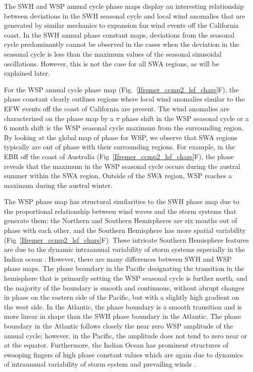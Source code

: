 \documentclass[draft,linenumbers]{agujournal2018}
\begin{document}
The SWH and WSP annual cycle phase maps display an interesting relationship between deviations in the SWH seasonal cycle and local wind anomalies that are generated by similar mechanics to expansion fan wind events off the California coast. In the SWH annual phase constant maps, deviations from the seasonal cycle predominantly cannot be observed in the cases when the deviation in the seasonal cycle is less than the maximum values of the seasonal sinusoidal oscillations. However, this is not the case for all SWA regions, as will be explained later.  

For the WSP annual cycle phase map (Fig.~\ref{Ifremer_ccmp2_lsf_chars}F), the phase constant clearly outlines regions where local wind anomalies similar to the EFW events off the coast of California are present. The wind anomalies are characterized on the phase map by a $\pi$ phase shift in the WSP seasonal cycle or a 6 month shift is the WSP seasonal cycle maximum from the surrounding region. By looking at the global map of phase for WSP, we observe that SWA regions typically are out of phase with their surrounding regions. For example, in the EBR off the coast of Australia (Fig~\ref{Ifremer_ccmp2_lsf_chars}F), the phase reveals that the maximum in the WSP seasonal cycle occurs during the austral summer within the SWA region. Outside of the SWA region, WSP reaches a maximum during the austral winter. 

The WSP phase map has structural similarities to the SWH phase map due to the proportional relationship between wind waves and the storm systems that generate them: the Northern and Southern Hemispheres are six months out of phase with each other, and the Southern Hemisphere has more spatial variability (Fig~\ref{Ifremer_ccmp2_lsf_chars}F). These intricate Southern Hemisphere features are due to the dynamic intraannual variability of storm systems especially in the Indian ocean \cite{schott2009indian}. However, there are many differences between SWH and WSP phase maps. The phase boundary in the Pacific designating the transition in the hemisphere that is primarily setting the WSP seasonal cycle is further north, and the majority of the boundary is smooth and continuous, without abrupt changes in phase on the eastern side of the Pacific, but with a slightly high gradient on the west side. In the Atlantic, the phase boundary is a smooth transition and is more linear in shape than the SWH phase boundary in the Atlantic. The phase boundary in the Atlantic follows closely the near zero WSP amplitude of the annual cycle; however, in the Pacific, the amplitude does not tend to zero near or at the equator. Furthermore, the Indian Ocean has prominent structures of swooping fingers of high phase constant values which are again due to dynamics of intraannual variability of storm system and prevailing winds \cite{schott2009indian}. 
\end{document}
